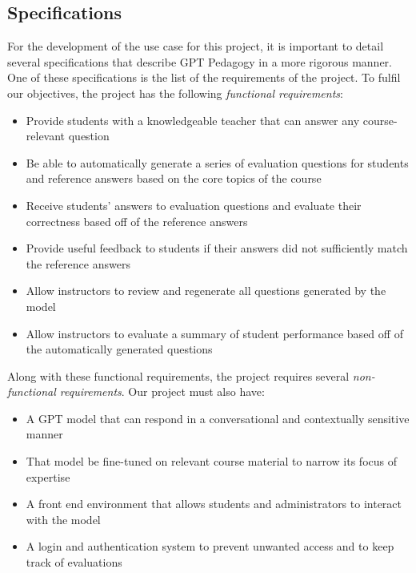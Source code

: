 \documentclass[12pt,a4paper]{article}
\begin{document}
    \subsection{Specifications}

    For the development of the use case for this project, it is important to detail several
    specifications that describe GPT Pedagogy in a more rigorous manner.  One of these specifications
    is the list of the requirements of the project.  To fulfil our objectives, the
    project has the following \textit{functional requirements}:

    \begin{itemize}
        \label{functionalReqs}

        \item Provide students with a knowledgeable teacher that can answer any course-relevant question
        \item Be able to automatically generate a series of evaluation questions for students and
        reference answers based on the core topics of the course
        \item Receive students' answers to evaluation questions and evaluate their correctness based
        off of the reference answers
        \item Provide useful feedback to students if their answers did not sufficiently match the
        reference answers
        \item Allow instructors to review and regenerate all questions generated by the model
        \item Allow instructors to evaluate a summary of student performance based off of the
        automatically generated questions
    \end{itemize}

    Along with these functional requirements, the project requires several \textit{non-functional
    requirements}.  Our project must also have:

    \begin{itemize}
        \label{nonFunctionalReqs}
        \item A GPT model that can respond in a conversational and contextually sensitive manner
        \item That model be fine-tuned on relevant course material to narrow its focus of expertise
        \item A front end environment that allows students and administrators to interact with the model
        \item A login and authentication system to prevent unwanted access and to keep track of evaluations
    \end{itemize}
\end{document}
